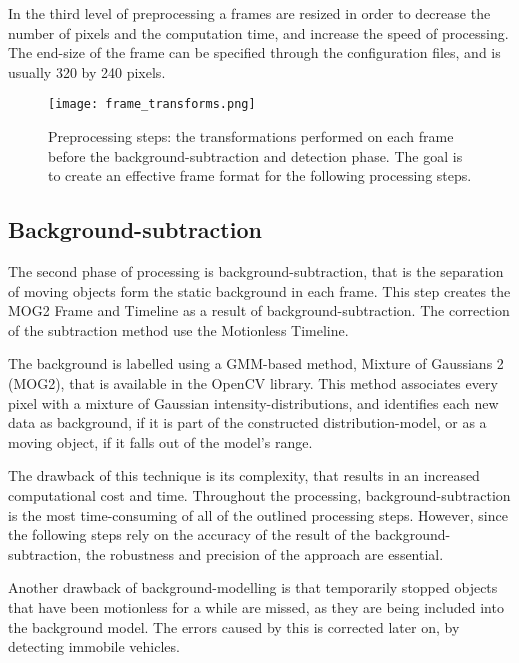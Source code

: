 In the third level of preprocessing a frames are resized in order to decrease the number of pixels and the computation time, and increase the speed of processing.
The end-size of the frame can be specified through the configuration files, and is usually 320 by 240 pixels.

\begin{figure}[!h]
	\centering
	\texttt{[image: frame\_transforms.png]}
	\caption[Steps of the preprocessing stage]{Preprocessing steps: the transformations performed on each frame before the background-subtraction and detection phase. The goal is to create an effective frame format for the following processing steps.\label{fig:transforms}}
\end{figure}
\subsection{Background-subtraction}\label{sec:background-subtraction}
The second phase of processing is background-subtraction, that is the separation of moving objects form the static background in each frame.
This step creates the MOG2 Frame and Timeline as a result of background-subtraction.
The correction of the subtraction method use the Motionless Timeline.

The background is labelled using a GMM-based method, Mixture of Gaussians 2 (MOG2), that is available in the OpenCV library.
This method associates every pixel with a mixture of Gaussian intensity-distributions, and identifies each new data as background, if it is part of the constructed distribution-model, or as a moving object, if it falls out of the model's range.

The drawback of this technique is its complexity, that results in an increased computational cost and time.
Throughout the processing, background-subtraction is the most time-consuming of all of the outlined processing steps.
However, since the following steps rely on the accuracy of the result of the background-subtraction, the robustness and precision of the approach are essential.

Another drawback of background-modelling is that temporarily stopped objects that have been motionless for a while are missed, as they are being included into the background model.
The errors caused by this is corrected later on, by detecting immobile vehicles.

